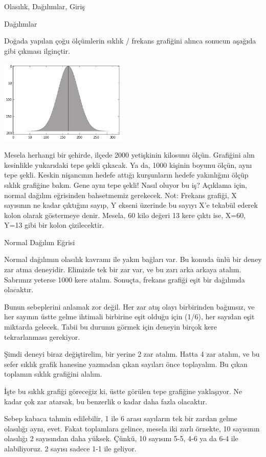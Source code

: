 \documentclass[12pt,fleqn]{article}\usepackage{../../common}
\begin{document}
Olasılık, Dağılımlar, Giriş

Dağılımlar

Doğada yapılan çoğu ölçümlerin sıklık / frekans grafiğini alınca sonucun
aşağıda gibi çıkması ilginçtir.

\includegraphics[height=4cm]{stat_intro_01.png}

Mesela herhangi bir şehirde, ilçede 2000 yetişkinin kilosunu ölçün. Grafiğini
alın kesinlikle yukarıdaki tepe şekli çıkacak. Ya da, 1000 kişinin boyunu ölçün,
aynı tepe şekli. Keskin nişancının hedefe attığı kurşunların hedefe yakınlığını
ölçüp sıklık grafiğine bakın. Gene aynı tepe şekli!  Nasıl oluyor bu iş?
Açıklama için, normal dağılım eğrisinden bahsetmemiz gerekecek. Not: Frekans
grafiği, X sayısının ne kadar çıktığını sayıp, Y ekseni üzerinde bu sayıyı X'e
tekabül ederek kolon olarak göstermeye denir. Mesela, 60 kilo değeri 13 kere
çıktı ise, X=60, Y=13 gibi bir kolon çizilecektir.

Normal Dağılım Eğrisi

Normal dağılımın olasılık kavramı ile yakın bağları var. Bu konuda ünlü bir
deney zar atma deneyidir. Elimizde tek bir zar var, ve bu zarı arka arkaya
atalım. Sabrımız yeterse 1000 kere atalım. Sonuçta, frekans grafiği eşit bir
dağılımda olacaktır.

Bunun sebeplerini anlamak zor değil. Her zar atış olayı birbirinden bağımsız, ve
her sayının üstte gelme ihtimali birbirine eşit olduğu için (1/6), her sayıdan
eşit miktarda gelecek. Tabii bu durumu görmek için deneyin birçok kere
tekrarlanması gerekiyor.

Şimdi deneyi biraz değiştirelim, bir yerine 2 zar atalım. Hatta 4 zar atalım, ve
bu sefer sıklık grafik hanesine yazmadan çıkan sayıları önce toplayalım. Bu
çıkan toplamın sıklık grafiğini alalım.

İşte bu sıklık grafiği göreceğiz ki, üstte görülen tepe grafiğine yaklaşıyor. Ne
kadar çok zar atarsak, bu benzerlik o kadar daha fazla olacaktır.

Sebep kabaca tahmin edilebilir, 1 ile 6 arası sayıların tek bir zardan gelme
olasılığı aynı, evet. Fakat toplamlara gelince, mesela iki zarlı örnekte, 10
sayısının olasılığı 2 sayısından daha yüksek. Çünkü, 10 sayısını 5-5, 4-6 ya da
6-4 ile alabiliyoruz. 2 sayısı sadece 1-1 ile geliyor.
\end{document}
